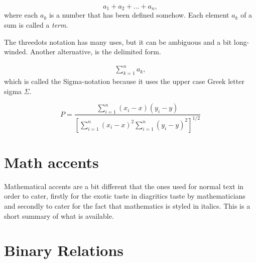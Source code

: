{{{\[a_1 + a_2 + \dots +a_n,\]
where each $a_k$ is a number that has been defined somehow. 
Each element $a_k$ of a sum is called a \emph{term}. 

The threedots notation has many uses, but it can be ambiguous and a bit long-winded. Another alternative, is the delimited form.

\begin{gather}
\sum_{k=1}^n a_k,
\end{gather}
which is called the Sigma-notation because it uses the upper case Greek letter sigma $\Sigma$.



\begin{equation*}
P = \frac{\displaystyle{
\sum_{i=1}^n (x_i- x)
(y_i- y)}}
{\displaystyle{\left[
\sum_{i=1}^n(x_i-x)^2
\sum_{i=1}^n(y_i- y)^2
\right]^{1/2}}}
\end{equation*}


\section{Math accents}

Mathematical accents are a bit different that the ones used for normal text in order to cater, firstly for the exotic taste in diagritics taste by mathematicians and secondly to cater for the fact that mathematics is styled in italics.
This is a short summary of what is available. 
\bigskip


\section{Binary Relations}


}}}
